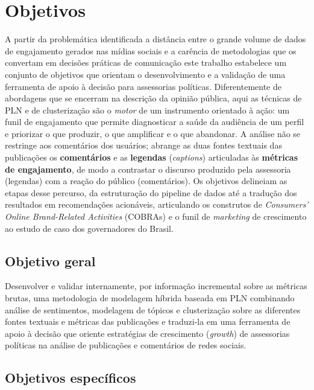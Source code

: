 \chapter{Objetivos}\label{Objetivos e Organização do Trabalho}

A partir da problemática identificada \textemdash{} a distância entre o grande volume de dados de engajamento gerados nas mídias sociais e a carência de metodologias que os convertam em decisões práticas de comunicação \textemdash{} este trabalho estabelece um conjunto de objetivos que orientam o desenvolvimento e a validação de uma ferramenta de apoio à decisão para assessorias políticas. Diferentemente de abordagens que se encerram na descrição da opinião pública, aqui as técnicas de PLN e de clusterização são o \emph{motor} de um instrumento orientado à ação: um funil de engajamento que permite diagnosticar a saúde da audiência de um perfil e priorizar o que produzir, o que amplificar e o que abandonar. A análise não se restringe aos comentários dos usuários; abrange as duas fontes textuais das publicações \textemdash{} os \textbf{comentários} e as \textbf{legendas} (\emph{captions}) \textemdash{} articuladas às \textbf{métricas de engajamento}, de modo a contrastar o discurso produzido pela assessoria (legendas) com a reação do público (comentários). Os objetivos delineiam as etapas desse percurso, da estruturação do pipeline de dados até a tradução dos resultados em recomendações acionáveis, articulando os construtos de \emph{Consumers' Online Brand-Related Activities} (COBRAs) \cite{muntinga2011} e o funil de \emph{marketing} de crescimento \cite{feroz2024} ao estudo de caso dos governadores do Brasil.

\section{Objetivo geral}

Desenvolver e validar internamente, por informação incremental sobre as métricas brutas, uma metodologia de modelagem híbrida baseada em PLN \textemdash{} combinando análise de sentimentos, modelagem de tópicos e clusterização sobre as diferentes fontes textuais e métricas das publicações \textemdash{} e traduzi-la em uma ferramenta de apoio à decisão que oriente estratégias de crescimento (\emph{growth}) de assessorias políticas na análise de publicações e comentários de redes sociais.

\section{Objetivos específicos}

